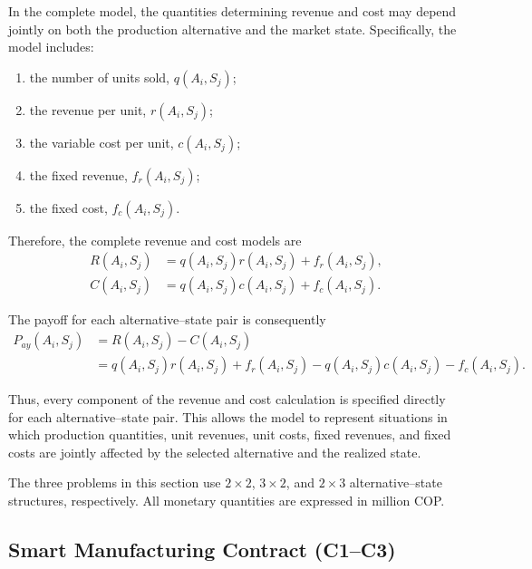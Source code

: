 \vspace{0.8cm}

In the complete model, the quantities determining revenue and cost may depend
jointly on both the production alternative and the market state. Specifically,
the model includes:

\begin{enumerate}[label=\arabic*.]
	\item the number of units sold, \(q(A_i,S_j)\);
	\item the revenue per unit, \(r(A_i,S_j)\);
	\item the variable cost per unit, \(c(A_i,S_j)\);
	\item the fixed revenue, \(f_r(A_i,S_j)\);
	\item the fixed cost, \(f_c(A_i,S_j)\).
\end{enumerate}

Therefore, the complete revenue and cost models are
\[
\begin{aligned}
	R(A_i,S_j)
	&=
	q(A_i,S_j)r(A_i,S_j)
	+
	f_r(A_i,S_j),
	\\
	C(A_i,S_j)
	&=
	q(A_i,S_j)c(A_i,S_j)
	+
	f_c(A_i,S_j).
\end{aligned}
\]

The payoff for each alternative--state pair is consequently
\[
\begin{aligned}
	P_{ay}(A_i,S_j)
	&=
	R(A_i,S_j)-C(A_i,S_j)
	\\
	&=
	q(A_i,S_j)r(A_i,S_j)
	+
	f_r(A_i,S_j)
	-
	q(A_i,S_j)c(A_i,S_j)
	-
	f_c(A_i,S_j).
\end{aligned}
\]

Thus, every component of the revenue and cost calculation is specified
directly for each alternative--state pair. This allows the model to represent
situations in which production quantities, unit revenues, unit costs, fixed
revenues, and fixed costs are jointly affected by the selected alternative and
the realized state.

The three problems in this section use \(2\times2\), \(3\times2\), and
\(2\times3\) alternative--state structures, respectively. All monetary
quantities are expressed in million COP.

\subsection{Smart Manufacturing Contract (C1--C3)}
\label{sec:problem19-smart-manufacturing-contract-c1-c3}

